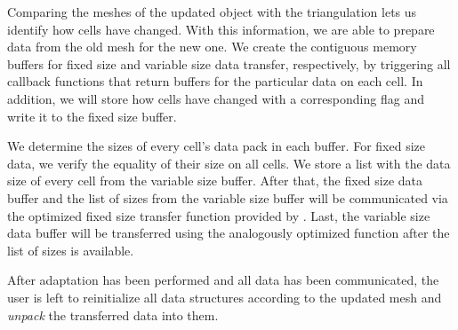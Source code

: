 Comparing the meshes of the updated \pforest{} object with the \dealii{} triangulation lets us identify how cells have changed.
With this information, we are able to prepare data from the old mesh for the new one. We create the contiguous memory buffers for fixed size and variable size data transfer, respectively, by triggering all callback functions that return buffers for the particular data on each cell. In addition, we will store how cells have changed with a corresponding flag and write it to the fixed size buffer.

We determine the sizes of every cell's data pack in each buffer. For fixed size data, we verify the equality of their size on all cells. We store a list with the data size of every cell from the variable size buffer. After that, the fixed size data buffer and the list of sizes from the variable size buffer will be communicated via the optimized fixed size transfer function provided by \pforest{} \parencite{burstedde2018}. Last, the variable size data buffer will be transferred using the analogously optimized function after the list of sizes is available. %



After adaptation has been performed and all data has been communicated, the user is left to reinitialize all data structures according to the updated mesh and \textit{unpack} the transferred data into them.

%

